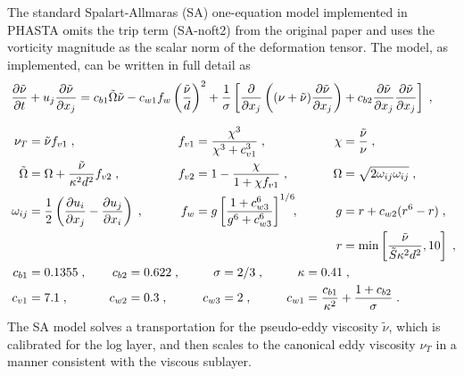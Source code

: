 \documentclass[11pt]{article}
\begin{document}
The standard Spalart-Allmaras (SA) one-equation model \cite{spalart1992} implemented in PHASTA omits the trip term (SA-noft2) from the original paper and uses the vorticity magnitude as the scalar norm of the deformation tensor. The model, as implemented, can be written in full detail as
\begin{align}
	\phantom{W_{ij}}
	&\begin{aligned}
		\mathllap{\pp{\tilde{\nu}}{t}}
		&+ u_j \pp{\tilde{\nu}}{x_j}
		=
		c_{b1} \tilde{\Omega} \tilde{\nu}
		-
		c_{w1} f_w \left( \frac{\tilde{\nu}}{d} \right)^2
		+
		\frac{1}{\sigma} 
		\left[
		\pp{}{x_j}
			\left( (\nu + \tilde{\nu}) \pp{\tilde{\nu}}{x_j} \right)
			+ c_{b2} \pp{\tilde{\nu}}{x_j} \pp{\tilde{\nu}}{x_j}
		\right]
		\;,
		\label{eq:SA_transport}
	\end{aligned} \\[0.25cm]
	&\begin{aligned}
		\mathllap{\nu_T} &= \tilde{\nu} f_{v1}
		\;, &\qquad
		f_{v1} &= \frac{\chi^3}{\chi^3 + c_{v1}^3}
		\;, &\qquad
		\chi &= \frac{\tilde{\nu}}{\nu}
		\;, \\
		\mathllap{\tilde{\Omega}} &= \Omega + \frac{\tilde{\nu}}{\kappa^2 d^2} f_{v2}
		\;, &\qquad
		f_{v2} &= 1 - \frac{\chi}{1 + \chi f_{v1}}
		\;, &\qquad
		\Omega &= \sqrt{2 \omega_{ij} \omega_{ij}}
		\;, \\
		\mathllap{\omega_{ij}} &= \frac{1}{2} \left( \pp{u_i}{x_j} - \pp{u_j}{x_i} \right)
		\;, &\qquad
		f_w &= g \left[ \frac{1 + c_{w3}^6}{g^6 + c_{w3}^6} \right]^{1/6}
		\!\!, &\qquad
		g &= r + c_{w2}(r^6 - r)
		\;, \\
		&&&&
		r &= \min \left[ \frac{\tilde{\nu}}{\tilde{S} \kappa^2 d^2}, 10 \right]
		\;,
		\label{eq:SA_definitions}
	\end{aligned} \\
	&\begin{aligned}
		\mathllap{c_{b1}} &= 0.1355
		\;, &\quad
		c_{b2} &= 0.622
		\;, &\quad
		\sigma &= 2/3
		\;, &\quad
		\kappa &= 0.41
		\;, \\
		\mathllap{c_{v1}} &= 7.1
		\;, &\quad
		c_{w2} &= 0.3
		\;, &\quad
		c_{w3} &= 2
		\;, &\quad
		c_{w1} &= \frac{c_{b1}}{\kappa^2} + \frac{1 + c_{b2}}{\sigma}
		\;.
		\label{eq:SA_constants}
	\end{aligned}
\end{align}
The SA model solves a transportation for the pseudo-eddy viscosity $\tilde{\nu}$, which is calibrated for the log layer, and then scales to the canonical eddy viscosity $\nu_T$ in a manner consistent with the viscous sublayer.
\end{document}
